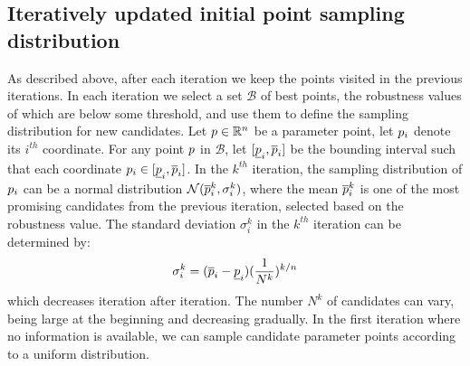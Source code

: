 \subsection{Iteratively updated initial point sampling distribution}
As described above, after each iteration we keep the points visited in the previous iterations. In each iteration we select a set $\mathcal{B}$ of best points, the robustness values of which are below some threshold, and use them to define the sampling distribution for new candidates. 
Let $p \in \mathbb{R}^n$ be a parameter point, let $p_i$ denote its $i^{th}$ coordinate. For any point $p$ in $\mathcal{B}$, let $[\underline{p}_i, \overline{p}_i]$  be the bounding interval such that each coordinate $p_i \in [\underline{p}_i, \overline{p}_i]$. In the $k^{th}$ iteration, the sampling distribution of $p_i$ can be a normal distribution $\mathcal{N}(\overline{p}^k_i, \sigma_i^k)$, where the mean $\overline{p}^k_i$ is one of the most promising candidates from the previous iteration, selected based on the robustness value. The standard deviation $\sigma_i^k$ in the $k^{th}$ iteration can be determined by: 
\begin{equation} \label{eq:sigma}
\sigma_i^k = (\overline{p}_i - \underline{p}_i) (\frac{1}{N^k})^{k/n}
\end{equation}
which decreases iteration after iteration. The number $N^k$ of candidates can vary, being large at the beginning and decreasing gradually. In the first iteration where no information is available, we can sample candidate parameter points according to a uniform distribution. 


